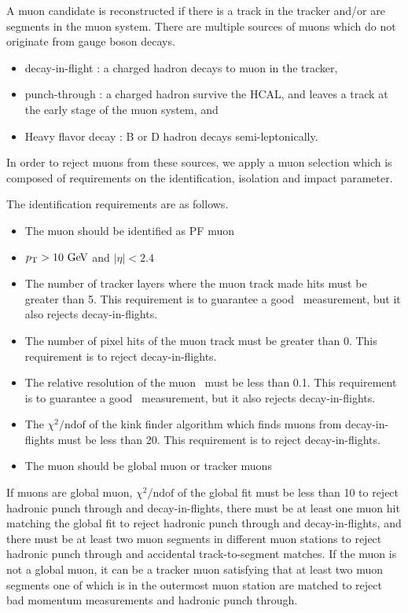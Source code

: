 A muon candidate is reconstructed if there 
is a track in the tracker and/or are segments in the muon system. 
There are multiple sources of muons which do not originate from gauge boson decays. 
\begin{itemize}
\item decay-in-flight : a charged hadron decays to muon in the tracker, 
\item punch-through : a charged hadron survive the HCAL, and leaves a track 
      at the early stage of the muon system, and 
\item Heavy flavor decay : B or D hadron decays semi-leptonically.  
\end{itemize}
In order to reject muons from these sources, 
we apply a muon selection which is composed of requirements 
on the identification,
isolation and impact parameter.  

The identification requirements are as follows. 
\begin{itemize}
\item The muon should be identified as PF muon

\item $p_\mathrm{T}>10~\mathrm{Ge\kern -0.1em V}$ and $|\eta|<2.4$ 

\item The number of tracker layers where the muon track made hits must be greater than 5. 
This requirement is to guarantee a good \pt\ measurement, but it also rejects 
decay-in-flights. 

\item The number of pixel hits of the muon track must be greater than 0.
This requirement is to reject decay-in-flights. 

\item The relative resolution of the muon \pt\ must be less than 0.1.  
This requirement is to guarantee a good \pt\ measurement, but it also rejects 
decay-in-flights. 

\item The $\displaystyle \chi^2/\textrm{ndof}$ of the kink finder algorithm 
which finds muons from decay-in-flights must be less than 20. 
This requirement is to reject decay-in-flights. 

\item The muon should be global muon or tracker muons  
\end{itemize}
If muons are global muon, $\chi^2/\textrm{ndof}$ of the global fit must be less than 10 
to reject hadronic punch through and decay-in-flights, 
there must be at least one muon hit matching the global fit 
to reject hadronic punch through and decay-in-flights, 
and there must be at least two muon segments in different muon stations
to reject hadronic punch through and accidental track-to-segment matches. 
If the muon is not a global muon, it can be a tracker muon satisfying 
that at least two muon segments one of which is in the outermost muon 
station are matched to reject bad momentum measurements and hadronic punch through.  

